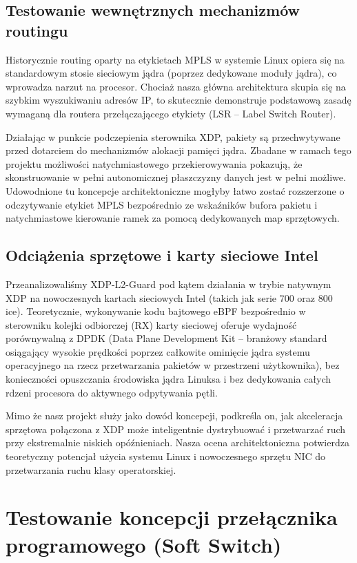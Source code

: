 \documentclass[11pt,a4paper]{article}
\begin{document}
\subsection{Testowanie wewnętrznych mechanizmów routingu}

Historycznie routing oparty na etykietach MPLS w systemie Linux opiera się na standardowym stosie sieciowym jądra (poprzez dedykowane moduły jądra), co wprowadza narzut na procesor. Chociaż nasza główna architektura skupia się na szybkim wyszukiwaniu adresów IP, to skutecznie demonstruje podstawową zasadę wymaganą dla routera przełączającego etykiety (LSR – Label Switch Router).

Działając w punkcie podczepienia sterownika XDP, pakiety są przechwytywane przed dotarciem do mechanizmów alokacji pamięci jądra. Zbadane w ramach tego projektu możliwości natychmiastowego przekierowywania pokazują, że skonstruowanie w pełni autonomicznej płaszczyzny danych jest w pełni możliwe. Udowodnione tu koncepcje architektoniczne mogłyby łatwo zostać rozszerzone o odczytywanie etykiet MPLS bezpośrednio ze wskaźników bufora pakietu i natychmiastowe kierowanie ramek za pomocą dedykowanych map sprzętowych.

\subsection{Odciążenia sprzętowe i karty sieciowe Intel}

Przeanalizowaliśmy XDP-L2-Guard pod kątem działania w trybie natywnym XDP na nowoczesnych kartach sieciowych Intel (takich jak serie 700 oraz 800 ice). Teoretycznie, wykonywanie kodu bajtowego eBPF bezpośrednio w sterowniku kolejki odbiorczej (RX) karty sieciowej oferuje wydajność porównywalną z DPDK (Data Plane Development Kit – branżowy standard osiągający wysokie prędkości poprzez całkowite ominięcie jądra systemu operacyjnego na rzecz przetwarzania pakietów w przestrzeni użytkownika), bez konieczności opuszczania środowiska jądra Linuksa i bez dedykowania całych rdzeni procesora do aktywnego odpytywania pętli.

Mimo że nasz projekt służy jako dowód koncepcji, podkreśla on, jak akceleracja sprzętowa połączona z XDP może inteligentnie dystrybuować i przetwarzać ruch przy ekstremalnie niskich opóźnieniach. Nasza ocena architektoniczna potwierdza teoretyczny potencjał użycia systemu Linux i nowoczesnego sprzętu NIC do przetwarzania ruchu klasy operatorskiej.

\section{Testowanie koncepcji przełącznika programowego (Soft Switch)}
\end{document}
